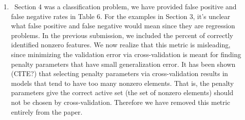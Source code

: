 \documentclass[]{article}
\newcommand{\reply}{\item[]\ }
\begin{document}
\begin{enumerate}
		\reply Section 4 was a classification problem, we have provided false positive and false negative rates in Table 6. For the examples in Section 3, it's unclear what false positive and false negative would mean since they are regression problems. In the previous submission, we included the percent of correctly identified nonzero features. We now realize that this metric is misleading, since minimizing the validation error via cross-validation is meant for finding penalty parameters that have small generalization error. It has been shown (CITE?) that selecting penalty parameters via cross-validation results in models that tend to have too many nonzero elements. That is, the penalty parameters give the correct active set (the set of nonzero elements) should not be chosen by cross-validation. Therefore we have removed this metric entirely from the paper.
		
	\end{enumerate}
\end{document}
